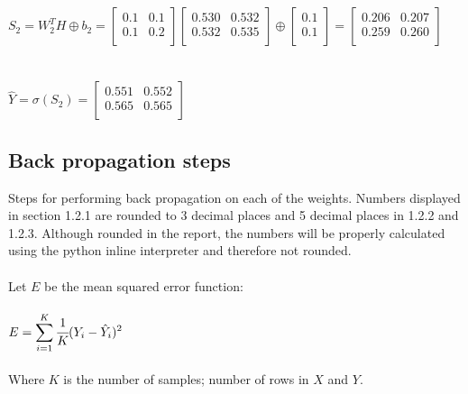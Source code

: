 \documentclass{article}
\begin{document}
\\
\\$S_2 = W_2^TH \oplus b_2 =
\begin{bmatrix}
0.1 & 0.1 \\
0.1 & 0.2 \\
\end{bmatrix}
\begin{bmatrix}
0.530 & 0.532 \\
0.532 & 0.535 \\
\end{bmatrix} \oplus
\begin{bmatrix}
0.1 \\
0.1 \\
\end{bmatrix}
=
\begin{bmatrix}
0.206 & 0.207 \\
0.259 & 0.260 \\
\end{bmatrix}$\\
\\
\\$\hat{Y} = \sigma(S_2) =
\begin{bmatrix}
0.551 & 0.552 \\
0.565 & 0.565 \\
\end{bmatrix}$
\clearpage

\subsection{Back propagation steps}
Steps for performing back propagation on each of the weights. Numbers displayed in section 1.2.1 are rounded to 3 decimal places and 5 decimal places in 1.2.2 and 1.2.3. Although rounded in the report, the numbers will be properly calculated using the python inline interpreter and therefore not rounded.\\
\\Let $E$ be the mean squared error function:\\
\\$E = \displaystyle \sum_{i=1}^{K}\cfrac{1}{K}(Y_i-\hat{Y}_i)^2$\\\\ Where $K$ is the number of samples; number of rows in $X$ and $Y$.\\
\end{document}
